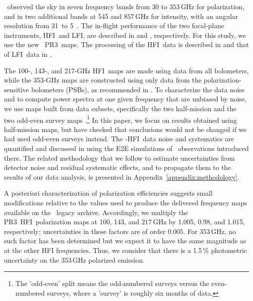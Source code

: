 \documentclass[longauth,traditabstract]{aa}
\newcommand{\HFI}{HFI}
\newcommand{\LFI}{LFI}
\newcommand{\PR}{PR3}
\begin{document}
\Planck\ observed the sky in seven frequency
bands from 30 to $353\,$GHz for polarization, and in two additional bands at 545 and $857\,$GHz for intensity, with an angular resolution
from 31\arcmin\ to 5\arcmin\ \citep{planck2013-p01}. 
The in-flight performance of the two focal-plane instruments, \HFI\ and \LFI, are described in \citet{planck2011-1.5} and \citet{planck2011-1.4}, respectively. 
For this study, we use the new \Planck\ \PR\ maps. 
The processing of the \HFI\ data is described in
\citet{planck2016-l03} and that of \LFI\ data in \citet{planck2016-l02}.

The 100-, 143-, and 217-GHz \HFI\ maps are made using data from all bolometers, while the 353-GHz maps are constructed using only data from the polarization-sensitive bolometers (PSBs), 
as recommended in \citet{planck2016-l03}. 
%
To characterize the data noise and to compute power spectra at one given frequency that are unbiased by noise, we use maps built from data subsets, specifically the two half-mission and the 
two odd-even
survey maps \citep{planck2016-l03}.\footnote{The 'odd-even' split means the odd-numbered surveys
versus the even-numbered surveys, where a 'survey' is roughly six months of
data.}  In this paper, we focus on results obtained using half-mission maps, but have checked that 
conclusions would not be changed if we had used odd-even surveys instead.
The \Planck-HFI\ data noise and systematics are quantified and discussed in \citet{planck2016-l03} 
using the E2E simulations of \Planck\ observations introduced there.
The related methodology that we follow to estimate uncertainties from detector noise and residual systematic effects, and to propagate them to the results of our data analysis, 
is presented in Appendix~\ref{appendix:methodology}.

A posteriori characterization of polarization efficiencies \citep{planck2016-l03} suggests small modifications relative to the values used to produce the delivered frequency maps available on the \Planck\ legacy archive.
Accordingly, we multiply the \PR\ \HFI\ polarization maps at 100, 143, and $217\,$GHz by 1.005, 0.98, and 1.015, respectively; uncertainties in these factors are of order 0.005.
For 353\,GHz, no such factor has been determined but we expect it to have the same magnitude as at the other HFI frequencies. Thus, we consider that there is a 1.5\,\% photometric uncertainty on the 353\,GHz polarized emission.
\end{document}
